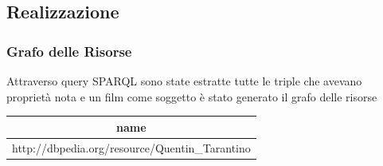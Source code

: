 \documentclass{beamer}
\begin{document}

\subsection{Realizzazione}


\begin{frame}
\frametitle{Grafo delle Risorse}
Attraverso query SPARQL sono state estratte tutte le triple che avevano proprietà nota e un film come soggetto
è stato generato il grafo delle risorse



\begin{tabular}{|c|}
  \hline
  name \\
  \hline
  http://dbpedia.org/resource/Quentin\_Tarantino \\
  \hline
\end{tabular}

\end{frame}

\end{document}

